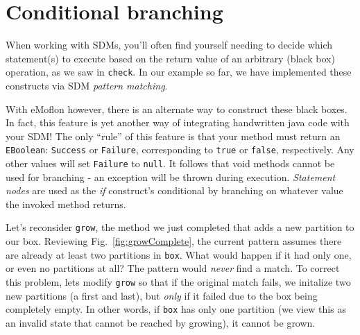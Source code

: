 \newpage
\hypertarget{sec:conBran}{}
\section{Conditional branching}
\genHeader

When working with SDMs, you'll often find yourself needing to decide which statement(s) to execute based on the return value of an arbitrary (black box)
operation, as we saw in \texttt{check}. In our example so far, we have implemented these constructs via SDM \emph{pattern matching}. 

With eMoflon however, there is an alternate way to construct these black boxes. In fact, this feature is yet another way of integrating handwritten java code
with your SDM! The only ``rule'' of this feature is that your method must return an \texttt{EBoolean}: \texttt{Success} or \texttt{Failure}, 
corresponding to \texttt{true} or \texttt{false}, respectively. Any other values will set \texttt{Failure} to \texttt{null}. It follows that void methods cannot
be used for branching - an exception will be thrown during execution. \emph{Statement nodes} are used as the \emph{if} construct's conditional by branching on
whatever value the invoked method returns.

Let's reconsider \texttt{grow}, the method we just completed that adds a new partition to our box. Reviewing Fig.~\ref{fig:growComplete}, the current pattern
assumes there are already at least two partitions in \texttt{box}. What would happen if it had only one, or even no partitions at all? The pattern would \emph{never}
find a match. To correct this problem, lets modify \texttt{grow} so that if the original match fails, we initalize two new partitions (a first and last), but
\emph{only} if it failed due to the box being completely empty. In other words, if \texttt{box} has only one partition (we view this as an invalid state that
cannot be reached by growing), it cannot be grown.





